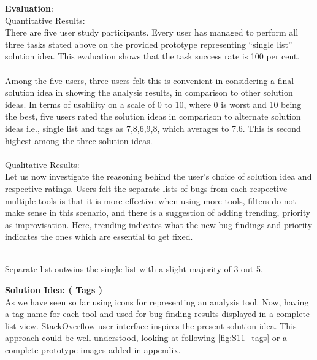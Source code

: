 \textbf{Evaluation}: \\

Quantitative Results: \\

There are five user study participants. Every user has managed to perform all three tasks stated above on the provided prototype representing “single list” solution idea. This evaluation shows that the task success rate is 100 per cent. \\ \\

Among the five users, three users felt this is convenient in considering a final solution idea in showing the analysis results, in comparison to other solution ideas.  In terms of usability on a scale of 0 to 10, where 0 is worst and 10 being the best, five users rated the solution ideas in comparison to alternate solution ideas i.e., single list and tags as 7,8,6,9,8, which averages to 7.6. This is second highest among the three solution ideas. \\ \\


Qualitative Results: \\

Let us now investigate the reasoning behind the user’s choice of solution idea and respective ratings. Users felt the separate lists of bugs from each respective multiple tools is that it is more effective when using more tools, filters do not make sense in this scenario, and there is a suggestion of adding trending, priority as improvisation. Here, trending indicates what the new bug findings and priority indicates the ones which are essential to get fixed. \\ \\

\begin{myboxi}
	Separate list outwins the single list with a slight majority of 3 out 5. 
\end{myboxi}

\clearpage

\textbf{Solution Idea: ( Tags )} \\

As we have seen so far using icons for representing an analysis tool. Now, having a tag name for each tool and used for bug finding results displayed in a complete list view. StackOverflow user interface inspires the present solution idea. This approach could be well understood, looking at following \autoref{fig:S11_tags} or a complete prototype images added in appendix. 
\\

